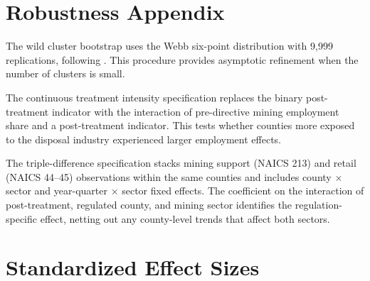 \documentclass[12pt]{article}
\begin{document}
\section{Robustness Appendix}

The wild cluster bootstrap uses the Webb six-point distribution with 9,999 replications, following \citet{cameron2008}. This procedure provides asymptotic refinement when the number of clusters is small.

The continuous treatment intensity specification replaces the binary post-treatment indicator with the interaction of pre-directive mining employment share and a post-treatment indicator. This tests whether counties more exposed to the disposal industry experienced larger employment effects.

The triple-difference specification stacks mining support (NAICS 213) and retail (NAICS 44--45) observations within the same counties and includes county $\times$ sector and year-quarter $\times$ sector fixed effects. The coefficient on the interaction of post-treatment, regulated county, and mining sector identifies the regulation-specific effect, netting out any county-level trends that affect both sectors.

\section{Standardized Effect Sizes}
\label{sec:sde}


\end{document}
